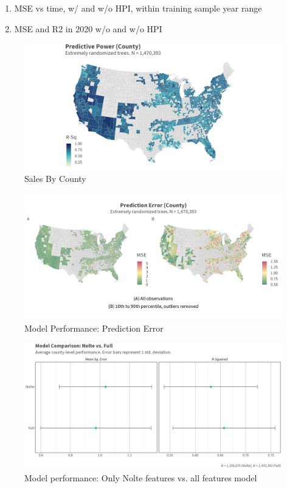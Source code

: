 \documentclass[12pt]{article}
\begin{document}
\begin{enumerate}
    \item MSE vs time, w/ and w/o HPI, within training sample year range
    \item MSE and R2 in 2020 w/o and w/o HPI 
\end{enumerate}

 
 
\begin{figure}
    \centering
    \includegraphics[width=6in]{figures/rf_rsq_map.png}
    \caption{Sales By County}
    \label{fig:rsq_county}
\end{figure}

\begin{figure}
    \centering
    \includegraphics[width=6in]{figures/rf_mse_map.png}
    \caption{Model Performance: Prediction Error}
    \label{fig:mse_county}
\end{figure}

\newpage

\begin{figure}
    \centering
    \includegraphics[width=6in]{figures/nolte_full_compare.png}
    \caption{Model performance: Only Nolte features vs. all features model}
    \label{fig:nolte_full_compare}
\end{figure}
\end{document}
